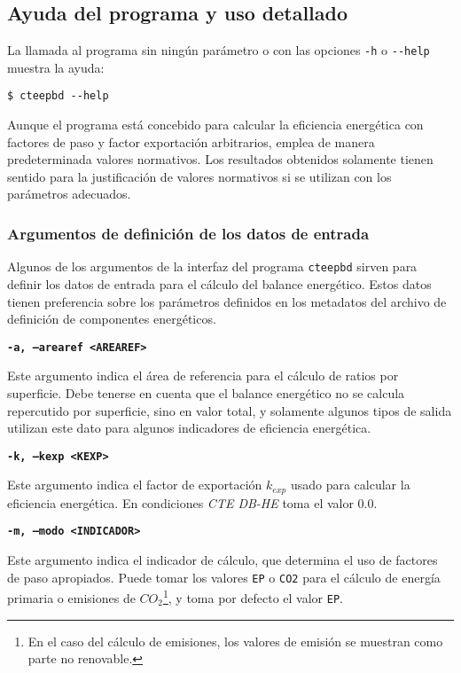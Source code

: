 \documentclass[10pt,notitlepage,oneside,a4paper]{article}
\begin{document}
\clearpage
\newpage
\subsection{Ayuda del programa y uso detallado}
La llamada al programa sin ningún parámetro o con las opciones \texttt{-h} o \texttt{-{}-help} muestra la ayuda:

\begin{Verbatim}[fontsize=\small]
	$ cteepbd --help
\end{Verbatim}


\begin{myquote}\footnotesize
Aunque el programa está concebido para calcular la eficiencia energética con factores de paso y factor exportación arbitrarios, emplea de manera predeterminada valores normativos. Los resultados obtenidos solamente tienen sentido para la justificación de valores normativos si se utilizan con los parámetros adecuados.
\end{myquote}

\subsubsection{Argumentos de definición de los datos de entrada}

Algunos de los argumentos de la interfaz del programa \texttt{cteepbd} sirven para definir los datos de entrada para el cálculo del balance energético. Estos datos tienen preferencia sobre los parámetros definidos en los metadatos del archivo de definición de componentes energéticos.

\textbf{\texttt{-a, --arearef <AREAREF>}}

Este argumento indica el área de referencia para el cálculo de ratios por superficie. Debe tenerse en cuenta que el balance energético no se calcula repercutido por superficie, sino en valor total, y solamente algunos tipos de salida utilizan este dato para algunos indicadores de eficiencia energética.

\textbf{\texttt{-k, --kexp <KEXP>}}

Este argumento indica el factor de exportación $k_{exp}$ usado para calcular la eficiencia energética. En condiciones \textit{CTE DB-HE} toma el valor $0.0$.

\textbf{\texttt{-m, --modo <INDICADOR>}}

Este argumento indica el indicador de cálculo, que determina el uso de factores de paso apropiados. Puede tomar los valores \texttt{EP} o \texttt{CO2} para el cálculo de energía primaria o emisiones de $CO_2$\footnote{En el caso del cálculo de emisiones, los valores de emisión se muestran como parte no renovable.}, y toma por defecto el valor \texttt{EP}.
\end{document}
